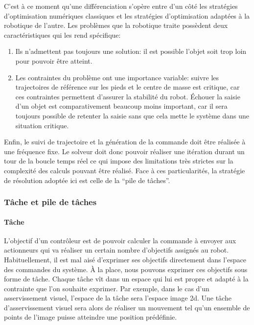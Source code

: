 C'est à ce moment qu'une différenciation s'opère entre d'un côté les
stratégies d'optimisation numériques classiques et les stratégies
d'optimisation adaptées à la robotique de l'autre. Les problèmes que
la robotique traite possèdent deux caractéristiques qui les rend
spécifique:
\begin{enumerate}
\item Ils n'admettent pas toujours une solution: il est possible
  l'objet soit trop loin pour pouvoir être atteint.
\item Les contraintes du problème ont une importance variable: suivre
  les trajectoires de référence sur les pieds et le centre de masse
  est critique, car ces contraintes permettent d'assurer la stabilité
  du robot. Échouer la saisie d'un objet est comparativement beaucoup
  moins important, car il sera toujours possible de retenter la saisie
  sans que cela mette le système dans une situation critique.
\end{enumerate}

Enfin, le suivi de trajectoire et la génération de la commande doit
être réalisée à une fréquence fixe. Le solveur doit donc pouvoir
réaliser une itération durant un tour de la boucle temps réel ce qui
impose des limitations très strictes sur la complexité des calculs
pouvant être réalisé. Face à ces particularités, la stratégie de
résolution adoptée ici est celle de la ``pile de tâches''.


\subsubsection{Tâche et pile de tâches}

\paragraph{Tâche}

L'objectif d'un contrôleur est de pouvoir calculer la commande à
envoyer aux actionneurs qui va réaliser un certain nombre d'objectifs
assignés au robot. Habituellement, il est mal aisé d'exprimer ses
objectifs directement dans l'espace des commandes du système. À la
place, nous pouvons exprimer ces objectifs sous forme de tâche. Chaque
tâche vît dans un espace qui lui est propre et adapté à la contrainte
que l'on souhaite exprimer. Par exemple, dans le cas d'un
asservissement visuel, l'espace de la tâche sera l'espace image
2d. Une tâche d'asservissement visuel sera alors de réaliser un
mouvement tel qu'un ensemble de points de l'image puisse atteindre une
position prédéfinie.

